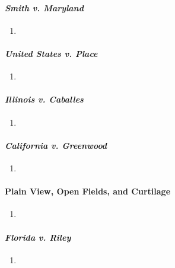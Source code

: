 \paragraph{\emph{Smith v. Maryland}} %

\begin{enumerate}
    \item 
\end{enumerate}

\paragraph{\emph{United States v. Place}} %

\begin{enumerate}
    \item 
\end{enumerate}

\paragraph{\emph{Illinois v. Caballes}} %

\begin{enumerate}
    \item 
\end{enumerate}

\paragraph{\emph{California v. Greenwood}} %

\begin{enumerate}
    \item 
\end{enumerate}

\paragraph{Plain View, Open Fields, and Curtilage} %

\begin{enumerate}
    \item 
\end{enumerate}

\paragraph{\emph{Florida v. Riley}} %

\begin{enumerate}
    \item 
\end{enumerate}

